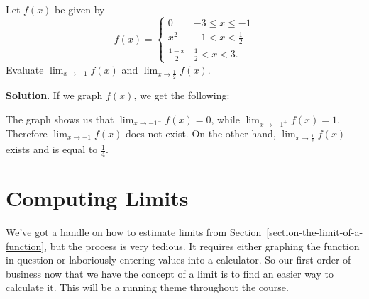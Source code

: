 \documentclass[10pt,]{book}
\theoremstyle{ptxplainnotitle}
\theoremstyle{ptxplaintitle}
\theoremstyle{ptxplainnotitle}
\theoremstyle{ptxplaintitle}
\theoremstyle{ptxplainnotitle}
\theoremstyle{ptxplaintitle}
\theoremstyle{ptxdefinitionnotitle}
\theoremstyle{ptxdefinitiontitle}
\theoremstyle{ptxdefinitionnotitle}
\theoremstyle{ptxdefinitiontitle}
\theoremstyle{ptxdefinitionnotitle}
\theoremstyle{ptxdefinitiontitle}
\theoremstyle{ptxdefinitionnotitle}
\theoremstyle{ptxdefinitiontitle}
\theoremstyle{ptxdefinitionnotitle}
\theoremstyle{ptxdefinitiontitle}
\numberwithin{equation}{section}
\begin{document}
\begin{example}\label{example-piecewise-function-again}
\hypertarget{p-16}{}%
Let \(f(x)\) be given by%
\begin{equation*}
f(x) = \begin{cases} 0 & -3\leq x \leq -1 \\ x^{2} & -1 < x < \frac{1}{2} \\ \frac{1-x}{2} & \frac{1}{2} < x < 3. \end{cases} 
\end{equation*}
Evaluate \(\lim_{x\to-1}f(x)\) and \(\lim_{x\to\frac{1}{2}}f(x)\).%
\par\smallskip%
\noindent\textbf{Solution}.\hypertarget{solution-3}{}\quad%
\hypertarget{p-17}{}%
If we graph \(f(x)\), we get the following:%
\begin{figure}
\centering
{
}
\end{figure}
\hypertarget{p-18}{}%
The graph shows us that \(\lim_{x\to-1^{-}}f(x) = 0\), while \(\lim_{x\to-1^{+}}f(x) = 1\). Therefore \(\lim_{x\to-1}f(x)\) does not exist. On the other hand, \(\lim_{x\to\frac{1}{2}}f(x)\) exists and is equal to \(\frac{1}{4}\).%
\end{example}
\typeout{************************************************}
\typeout{************************************************}
\section[{Computing Limits}]{Computing Limits}\label{section-computing-limits}
\hypertarget{p-19}{}%
We've got a handle on how to estimate limits from \hyperref[section-the-limit-of-a-function]{Section~\ref{section-the-limit-of-a-function}}, but the process is very tedious. It requires either graphing the function in question or laboriously entering values into a calculator. So our first order of business now that we have the concept of a limit is to find an easier way to calculate it. This will be a running theme throughout the course.%
\typeout{************************************************}
\typeout{************************************************}
\end{document}

